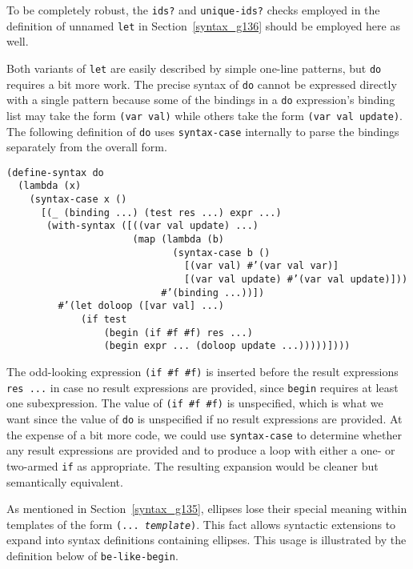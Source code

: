 To be completely robust, the \texttt{ids?} and \texttt{unique-ids?} checks
employed in the definition of unnamed \texttt{let} in Section \ref{syntax_g136}
should be employed here as well.


Both variants of \texttt{let} are easily described by simple one-line patterns,
but \texttt{do} requires a bit more work.
The precise syntax of \label{syntax_s53}\texttt{do} cannot be expressed directly with a
single pattern because some of the bindings in a \texttt{do}
expression's binding list may take the form \texttt{(var val)} while
others take the form \texttt{(var val update)}.
The following definition of \texttt{do} uses \texttt{syntax-case}
internally to parse the bindings separately from the overall form.


\begin{alltt}
(define-syntax do\label{syntax_defn_do}
  (lambda (x)
    (syntax-case x ()
      [(\_{} (binding ...) (test res ...) expr ...)
       (with-syntax ([((var val update) ...)
                      (map (lambda (b)
                             (syntax-case b ()
                               [(var val) \#{}'(var val var)]
                               [(var val update) \#{}'(var val update)]))
                           \#{}'(binding ...))])
         \#{}'(let doloop ([var val] ...)
             (if test
                 (begin (if \#{}f \#{}f) res ...)
                 (begin expr ... (doloop update ...)))))])))
\end{alltt}


The odd-looking expression \texttt{(if \#{}f \#{}f)} is inserted before the
result expressions \texttt{res ...} in case no result expressions are
provided, since \texttt{begin} requires at least one subexpression.
The value of \texttt{(if \#{}f \#{}f)} is unspecified, which is what we want
since the value of \texttt{do} is unspecified if no result expressions
are provided.
At the expense of a bit more code, we could use \texttt{syntax-case} to
determine whether any result expressions are provided and to produce a
loop with either a one- or two-armed \texttt{if} as appropriate.
The resulting expansion would be cleaner but semantically equivalent.


As mentioned in Section \ref{syntax_g135},
ellipses lose their special meaning
within templates of the form \texttt{(... \textit{template})}.
This fact allows syntactic extensions
to expand into syntax definitions containing ellipses.
This usage is illustrated by the definition below of
\label{syntax_s54}\texttt{be-like-begin}.


